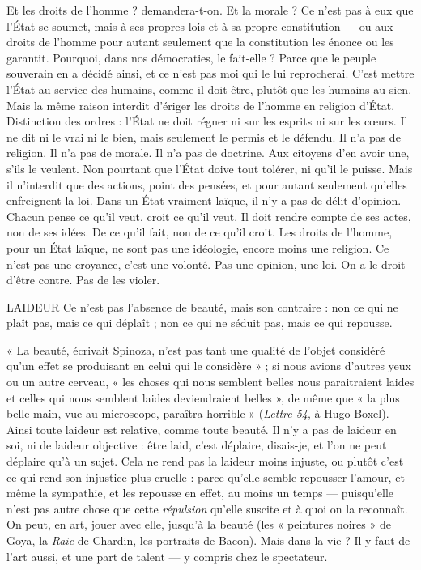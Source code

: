 {Et les droits de l’homme ? demandera-t-on. Et la morale ? Ce n’est pas à
eux que l’État se soumet, mais à ses propres lois et à sa propre constitution — ou
aux droits de l’homme pour autant seulement que la constitution les énonce ou
les garantit. Pourquoi, dans nos démocraties, le fait-elle ? Parce que le peuple
souverain en a décidé ainsi, et ce n’est pas moi qui le lui reprocherai. C'est
mettre l’État au service des humains, comme il doit être, plutôt que les
humains au sien. Mais la même raison interdit d’ériger les droits de l’homme
en religion d’État. Distinction des ordres : l’État ne doit régner ni sur les esprits
ni sur les cœurs. Il ne dit ni le vrai ni le bien, mais seulement le permis et le
défendu. Il n’a pas de religion. Il n’a pas de morale. Il n’a pas de doctrine. Aux
citoyens d’en avoir une, s'ils le veulent. Non pourtant que l’État doive tout
tolérer, ni qu’il le puisse. Mais il n’interdit que des actions, point des pensées,
et pour autant seulement qu’elles enfreignent la loi. Dans un État vraiment
laïque, il n’y a pas de délit d'opinion. Chacun pense ce qu’il veut, croit ce qu’il
veut. Il doit rendre compte de ses actes, non de ses idées. De ce qu’il fait, non
de ce qu’il croit. Les droits de l’homme, pour un État laïque, ne sont pas une
idéologie, encore moins une religion. Ce n’est pas une croyance, c’est une
volonté. Pas une opinion, une loi. On a le droit d’être contre. Pas de les violer.

LAIDEUR Ce n’est pas l’absence de beauté, mais son contraire : non ce qui
ne plaît pas, mais ce qui déplaît ; non ce qui ne séduit pas, mais
ce qui repousse.

« La beauté, écrivait Spinoza, n’est pas tant une qualité de l’objet considéré
qu'un effet se produisant en celui qui le considère » ; si nous avions d’autres
yeux ou un autre cerveau, « les choses qui nous semblent belles nous paraitraient
laides et celles qui nous semblent laides deviendraient belles », de même
que « la plus belle main, vue au microscope, paraîtra horrible » ({\it Lettre 54}, à
Hugo Boxel). Ainsi toute laideur est relative, comme toute beauté. Il n’y a pas
de laideur en soi, ni de laideur objective : être laid, c’est déplaire, disais-je, et
l’on ne peut déplaire qu’à un sujet. Cela ne rend pas la laideur moins injuste,
ou plutôt c’est ce qui rend son injustice plus cruelle : parce qu’elle semble
repousser l’amour, et même la sympathie, et les repousse en effet, au moins un
temps — puisqu'elle n’est pas autre chose que cette {\it répulsion} qu’elle suscite et à
quoi on la reconnaît. On peut, en art, jouer avec elle, jusqu’à la beauté (les
« peintures noires » de Goya, la {\it Raie} de Chardin, les portraits de Bacon). Mais
dans la vie ? Il y faut de l’art aussi, et une part de talent — y compris chez le
spectateur.

}
